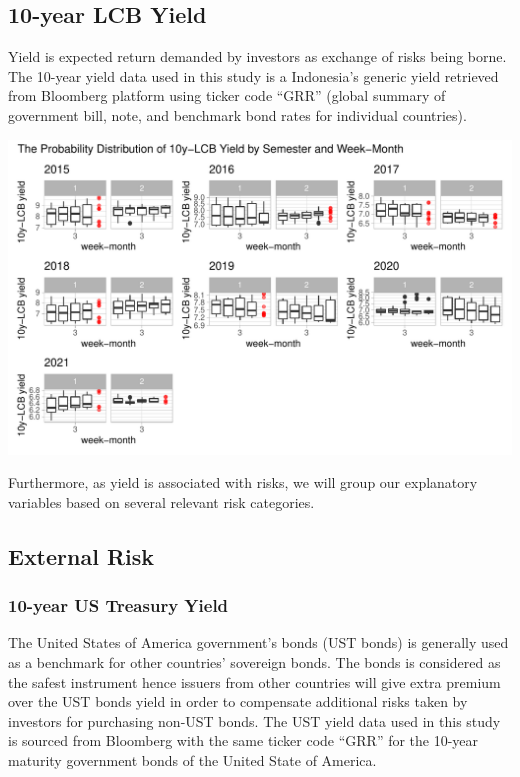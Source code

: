\documentclass[11pt,a4paper,]{article}
\begin{document}
\hypertarget{year-lcb-yield}{%
\subsection{10-year LCB Yield}\label{year-lcb-yield}}

Yield is expected return demanded by investors as exchange of risks being borne. The 10-year yield data used in this study is a Indonesia's generic yield retrieved from Bloomberg platform using ticker code ``GRR'' (global summary of government bill, note, and benchmark bond rates for individual countries).

\includegraphics{Untitled_files/figure-latex/unnamed-chunk-3-1.pdf}

Furthermore, as yield is associated with risks, we will group our explanatory variables based on several relevant risk categories.

\hypertarget{external-risk}{%
\subsection{External Risk}\label{external-risk}}

\hypertarget{year-us-treasury-yield}{%
\subsubsection{10-year US Treasury Yield}\label{year-us-treasury-yield}}

The United States of America government's bonds (UST bonds) is generally used as a benchmark for other countries' sovereign bonds. The bonds is considered as the safest instrument hence issuers from other countries will give extra premium over the UST bonds yield in order to compensate additional risks taken by investors for purchasing non-UST bonds.
The UST yield data used in this study is sourced from Bloomberg with the same ticker code ``GRR'' for the 10-year maturity government bonds of the United State of America.
\end{document}
